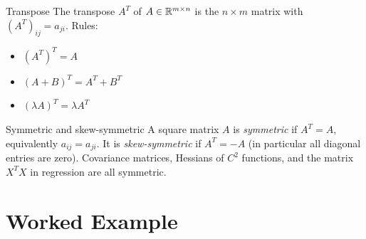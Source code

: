 \begin{rulebox}{Transpose}
The transpose $A^{T}$ of $A \in \mathbb{R}^{m \times n}$ is the $n \times m$ matrix
with $(A^{T})_{ij} = a_{ji}$. Rules:
\begin{itemize}[leftmargin=1.6em,itemsep=0.3ex]
  \item $(A^{T})^{T} = A$
  \item $(A + B)^{T} = A^{T} + B^{T}$
  \item $(\lambda A)^{T} = \lambda A^{T}$
\end{itemize}
\end{rulebox}

\begin{rulebox}{Symmetric and skew-symmetric}
A square matrix $A$ is \emph{symmetric} if $A^{T} = A$, equivalently
$a_{ij} = a_{ji}$. It is \emph{skew-symmetric} if $A^{T} = -A$ (in particular
all diagonal entries are zero). Covariance matrices, Hessians of $C^{2}$
functions, and the matrix $X^{T} X$ in regression are all symmetric.
\end{rulebox}

\section{Worked Example}


